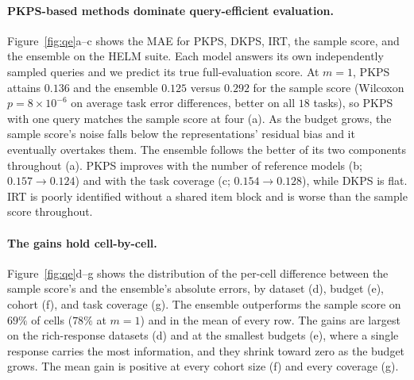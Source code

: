 \documentclass{article}
\theoremstyle{definition}
\theoremstyle{remark}
\theoremstyle{plain}
\newcommand{\PKPS}{PKPS\xspace}
\begin{document}

\paragraph{\PKPS-based methods dominate query-efficient evaluation.}
Figure~\ref{fig:qe}a--c shows the MAE for \PKPS, DKPS, IRT, the sample score, and
the ensemble on the HELM suite.
Each model answers its own independently sampled queries and we predict its true
full-evaluation score.
At $m{=}1$, \PKPS attains $0.136$ and the ensemble $0.125$ versus $0.292$ for the sample score (Wilcoxon $p{=}8\times10^{-6}$ on average task error differences, better on all $18$ tasks), so \PKPS with one query matches the sample score at four (a).
As the budget grows, the sample score's noise falls below the representations'
residual bias and it eventually overtakes them.
The ensemble follows the better of its two components
throughout (a).
\PKPS improves with the number of reference models
(b; $0.157\!\to\!0.124$) and with the task coverage (c; $0.154\!\to\!0.128$),
while DKPS is flat.
IRT is poorly identified without a shared item block and is worse than the sample
score throughout.

\paragraph{The gains hold cell-by-cell.}
Figure~\ref{fig:qe}d--g shows the distribution of the per-cell difference between
the sample score's and the ensemble's absolute errors, by dataset (d), budget (e),
cohort (f), and task coverage (g).
The ensemble outperforms the sample score on $69\%$ of cells ($78\%$ at $m{=}1$)
and in the mean of every row.
The gains are largest on the rich-response datasets (d) and at the smallest budgets
(e), where a single response carries the most information, and they shrink toward
zero as the budget grows.
The mean gain is positive at every cohort size (f) and every coverage (g).
\end{document}
